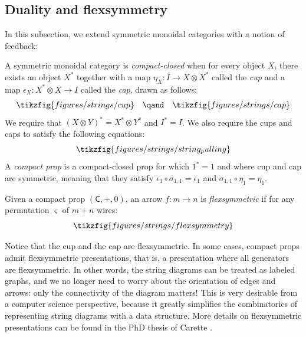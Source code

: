 \subsection{Duality and flexsymmetry}
In this subsection, we extend symmetric monoidal categories with a notion of feedback:
\begin{definition}
  A symmetric monoidal category is {\em compact-closed} when  for every object \(X\), there exists an object \(X^*\) together with a map \(\eta_X : I \to X \otimes X^*\) called the {\em cup} and a map  \(\epsilon_X : X^* \otimes X \to I\) called the {\em cap}, drawn as follows:
  \begin{equation}
    \tikzfig{figures/strings/cup}
    \quad\qand\quad
    \tikzfig{figures/strings/cap}
  \end{equation}
  We require that \((X\otimes Y)^*=X^*\otimes Y^*\) and \(I^*=I\).  We also require the cups and caps to satisfy the following equations:
  \begin{equation}
    \tikzfig{figures/strings/string_pulling}
  \end{equation}
  A {\em compact prop} is a compact-closed prop for which \(1^*=1\) and where cup and cap are symmetric, meaning that they satisfy $\epsilon_1 \circ \sigma_{1,1} = \epsilon_1 $ and $\sigma_{1,1} \circ \eta_1  = \eta_1 $.
\end{definition}
\begin{definition}
 \label{def:flexsym}
  Given a compact prop \((\mathsf{C},+ ,0)\), an arrow \(f : m \to n\) is \emph{flexsymmetric} if for any permutation \(\varsigma\) of \(m+n\) wires:
  \begin{equation}
    \tikzfig{figures/strings/flexsymmetry}
  \end{equation}
\end{definition}
Notice that the cup and the cap are flexsymmetric. In some cases, compact props admit flexsymmetric presentations, that is, a presentation where all generators are flexsymmetric. In other words, the string diagrams can be treated as labeled graphs, and we no longer need to worry about the orientation of edges and arrows: only the connectivity of the diagram matters! This is very desirable from a computer science perspective, because it greatly simplifies the combinatorics of representing string diagrams with a data structure. More details on flexsymmetric presentations can be found in the PhD thesis of Carette \cite{carettethesis}.
